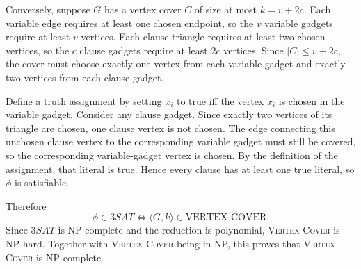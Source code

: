\documentclass[a4paper, UTF-8]{article}
\theoremstyle{plain}
\begin{document}
Conversely, suppose $G$ has a vertex cover $C$ of size at most $k=v+2c$. Each
variable edge requires at least one chosen endpoint, so the $v$ variable gadgets
require at least $v$ vertices. Each clause triangle requires at least two chosen
vertices, so the $c$ clause gadgets require at least $2c$ vertices. Since
$|C|\le v+2c$, the cover must choose exactly one vertex from each variable
gadget and exactly two vertices from each clause gadget.

Define a truth assignment by setting $x_i$ to true iff the vertex $x_i$ is chosen
in the variable gadget. Consider any clause gadget. Since exactly two vertices
of its triangle are chosen, one clause vertex is not chosen. The edge connecting
this unchosen clause vertex to the corresponding variable gadget must still be
covered, so the corresponding variable-gadget vertex is chosen. By the definition
of the assignment, that literal is true. Hence every clause has at least one true
literal, so $\phi$ is satisfiable.

Therefore
\[
\phi\in 3SAT \iff \langle G,k\rangle\in \text{VERTEX COVER}.
\]
Since $3SAT$ is NP-complete and the reduction is polynomial, \textsc{Vertex
Cover} is NP-hard. Together with \textsc{Vertex Cover} being in NP, this proves
that \textsc{Vertex Cover} is NP-complete.
\end{document}
